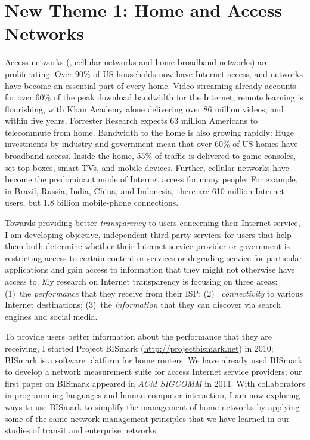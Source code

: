 \section*{New Theme 1: Home and Access Networks}

Access networks (\ie, cellular networks and home broadband networks) are
proliferating: Over 90\% of US households now have Internet access, and
networks have become an essential part of every home.  Video streaming
already accounts for over 60\% of the peak download bandwidth for the
Internet;
remote learning is flourishing, with Khan Academy alone delivering over
86 million videos; and within five years, Forrester
Research expects 63 million Americans to telecommute from
home. Bandwidth to the home is also growing
rapidly: Huge investments by industry and government mean that over 60\%
of US homes have broadband access.  Inside the
home, 55\% of traffic is delivered to game consoles, set-top boxes,
smart TVs, and mobile devices.  Further, cellular
networks have become the predominant mode of Internet access for many
people: For example, in Brazil, Russia, India, China, and Indonesia,
there are 610 million Internet users, but 1.8 billion mobile-phone
connections.

Towards providing better {\em transparency} to users concerning their
Internet service, I am developing objective, independent third-party
services for users that help them both determine whether their Internet
service provider or government is restricting access to certain content
or services or degrading service for particular applications and gain
access to information that they might not otherwise have access to.  My
research on Internet transparency is focusing on three areas: (1)~the
{\em performance} that they receive from their ISP; (2)~{\em
connectivity} to various Internet destinations; (3)~the {\em
information} that they can discover via search engines and social media.

To provide users better information about the performance that they are
receiving, I started Project BISmark (\url{http://projectbismark.net})
in 2010; BISmark is a software platform for home routers.  We have
already used BISmark to develop a network measurement suite for access
Internet service providers; our first paper on BISmark appeared in {\em
ACM SIGCOMM} in 2011.  With collaborators in programming languages and
human-computer interaction, I am now exploring ways to use BISmark to
simplify the management of home networks by applying some of the same
network management principles that we have learned in our studies of
transit and enterprise networks.

